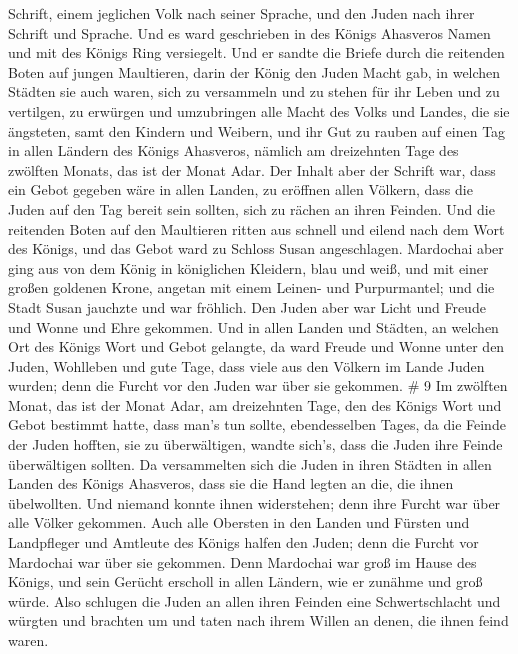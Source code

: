 Schrift, einem jeglichen Volk nach seiner Sprache, und den Juden nach
ihrer Schrift und Sprache.  Und es ward geschrieben in des
Königs Ahasveros Namen und mit des Königs Ring versiegelt. Und er sandte
die Briefe durch die reitenden Boten auf jungen Maultieren,
 darin der König den Juden Macht gab, in welchen Städten
sie auch waren, sich zu versammeln und zu stehen für ihr Leben und zu
vertilgen, zu erwürgen und umzubringen alle Macht des Volks und Landes,
die sie ängsteten, samt den Kindern und Weibern, und ihr Gut zu rauben
 auf einen Tag in allen Ländern des Königs Ahasveros,
nämlich am dreizehnten Tage des zwölften Monats, das ist der Monat Adar.
 Der Inhalt aber der Schrift war, dass ein Gebot gegeben
wäre in allen Landen, zu eröffnen allen Völkern, dass die Juden auf den
Tag bereit sein sollten, sich zu rächen an ihren Feinden. 
Und die reitenden Boten auf den Maultieren ritten aus schnell und eilend
nach dem Wort des Königs, und das Gebot ward zu Schloss Susan
angeschlagen.  Mardochai aber ging aus von dem König in
königlichen Kleidern, blau und weiß, und mit einer großen goldenen
Krone, angetan mit einem Leinen- und Purpurmantel; und die Stadt Susan
jauchzte und war fröhlich.  Den Juden aber war Licht und
Freude und Wonne und Ehre gekommen.  Und in allen Landen
und Städten, an welchen Ort des Königs Wort und Gebot gelangte, da ward
Freude und Wonne unter den Juden, Wohlleben und gute Tage, dass viele
aus den Völkern im Lande Juden wurden; denn die Furcht vor den Juden war
über sie gekommen. \# 9  Im zwölften Monat, das ist der
Monat Adar, am dreizehnten Tage, den des Königs Wort und Gebot bestimmt
hatte, dass man's tun sollte, ebendesselben Tages, da die Feinde der
Juden hofften, sie zu überwältigen, wandte sich's, dass die Juden ihre
Feinde überwältigen sollten.  Da versammelten sich die Juden
in ihren Städten in allen Landen des Königs Ahasveros, dass sie die Hand
legten an die, die ihnen übelwollten. Und niemand konnte ihnen
widerstehen; denn ihre Furcht war über alle Völker gekommen.
 Auch alle Obersten in den Landen und Fürsten und
Landpfleger und Amtleute des Königs halfen den Juden; denn die Furcht
vor Mardochai war über sie gekommen.  Denn Mardochai war
groß im Hause des Königs, und sein Gerücht erscholl in allen Ländern,
wie er zunähme und groß würde.  Also schlugen die Juden an
allen ihren Feinden eine Schwertschlacht und würgten und brachten um und
taten nach ihrem Willen an denen, die ihnen feind waren. 
